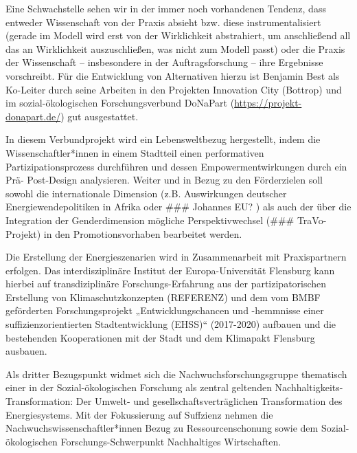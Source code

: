 \documentclass[a4paper,11pt,twoside]{scrartcl}
\begin{document}
Eine Schwachstelle sehen wir in der immer noch vorhandenen Tendenz, dass entweder Wissenschaft von der Praxis absieht bzw. diese instrumentalisiert (gerade im Modell wird erst von der Wirklichkeit abstrahiert, um anschließend all das an Wirklichkeit auszuschließen, was nicht zum Modell passt) oder die Praxis der Wissenschaft – insbesondere in der Auftragsforschung – ihre Ergebnisse vorschreibt. Für die Entwicklung von Alternativen hierzu ist Benjamin Best als Ko-Leiter durch seine Arbeiten in den Projekten Innovation City (Bottrop) und im sozial-ökologischen Forschungsverbund DoNaPart (\url{https://projekt-donapart.de/}) gut ausgestattet. 

In diesem Verbundprojekt wird ein Lebensweltbezug hergestellt, indem die Wissenschaftler*innen in einem Stadtteil einen performativen Partizipationsprozess durchführen und dessen Empowermentwirkungen durch ein Prä- Post-Design analysieren. 
Weiter und in Bezug zu den Förderzielen soll sowohl die internationale Dimension (z.B. Auswirkungen deutscher Energiewendepolitiken in Afrika oder ### Johannes EU? ) als auch der über die Integration der Genderdimension mögliche Perspektivwechsel (### TraVo-Projekt) in den Promotionsvorhaben bearbeitet werden.

Die Erstellung der Energieszenarien wird in Zusammenarbeit mit Praxispartnern erfolgen. Das interdisziplinäre Institut der Europa-Universität Flensburg kann hierbei auf transdiziplinäre Forschungs-Erfahrung aus der partizipatorischen Erstellung von Klimaschutzkonzepten (REFERENZ) und dem vom BMBF geförderten Forschungsprojekt „Entwicklungschancen und -hemmnisse einer suffizienzorientierten Stadtentwicklung (EHSS)“ (2017-2020) aufbauen und die bestehenden Kooperationen mit der Stadt und dem Klimapakt Flensburg ausbauen.

Als dritter Bezugspunkt widmet sich die Nachwuchsforschungsgruppe thematisch einer in der Sozial-ökologischen Forschung als zentral geltenden Nachhaltigkeits-Transformation: Der Umwelt- und gesellschaftsverträglichen Transformation des Energiesystems. Mit der Fokussierung auf Suffzienz nehmen die Nachwuchswissenschaftler*innen Bezug zu Ressourcenschonung sowie dem Sozial-ökologischen Forschungs-Schwerpunkt Nachhaltiges Wirtschaften.
\end{document}
